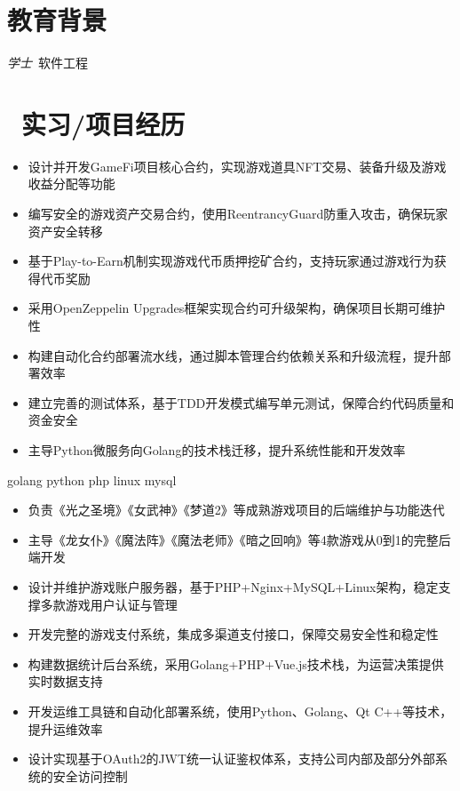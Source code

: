 \documentclass{resume}
\begin{document}


 
\section{\faGraduationCap  教育背景}
\textit{学士}\ 软件工程

\section{\faUsers\ 实习/项目经历}
\role{区块链后端开发}

\begin{itemize}
  \item 设计并开发GameFi项目核心合约，实现游戏道具NFT交易、装备升级及游戏收益分配等功能
  \item 编写安全的游戏资产交易合约，使用ReentrancyGuard防重入攻击，确保玩家资产安全转移
  \item 基于Play-to-Earn机制实现游戏代币质押挖矿合约，支持玩家通过游戏行为获得代币奖励
  \item 采用OpenZeppelin Upgrades框架实现合约可升级架构，确保项目长期可维护性
  \item 构建自动化合约部署流水线，通过脚本管理合约依赖关系和升级流程，提升部署效率
  \item 建立完善的测试体系，基于TDD开发模式编写单元测试，保障合约代码质量和资金安全
  \item 主导Python微服务向Golang的技术栈迁移，提升系统性能和开发效率
\end{itemize}


 {golang python php linux mysql}

\begin{onehalfspacing}
\begin{itemize}
  \item 负责《光之圣境》《女武神》《梦道2》等成熟游戏项目的后端维护与功能迭代
  \item 主导《龙女仆》《魔法阵》《魔法老师》《暗之回响》等4款游戏从0到1的完整后端开发
  \item 设计并维护游戏账户服务器，基于PHP+Nginx+MySQL+Linux架构，稳定支撑多款游戏用户认证与管理
  \item 开发完整的游戏支付系统，集成多渠道支付接口，保障交易安全性和稳定性
  \item 构建数据统计后台系统，采用Golang+PHP+Vue.js技术栈，为运营决策提供实时数据支持
  \item 开发运维工具链和自动化部署系统，使用Python、Golang、Qt C++等技术，提升运维效率
  \item 设计实现基于OAuth2的JWT统一认证鉴权体系，支持公司内部及部分外部系统的安全访问控制
\end{itemize}
\end{onehalfspacing}
\end{document}
